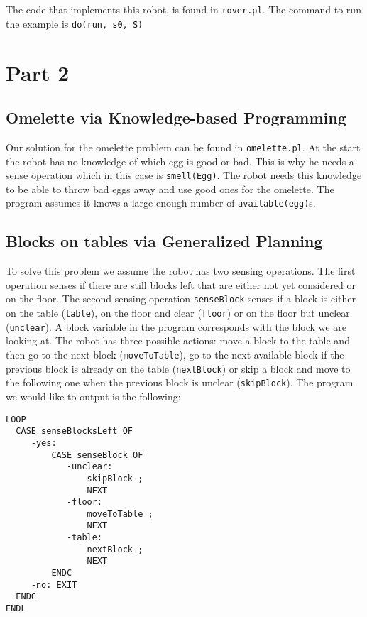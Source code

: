 \documentclass{article}
\begin{document}
The code that implements this robot, is found in \texttt{rover.pl}. The command to run the example is \texttt{do(run, s0, S)}

\section{Part 2}

\subsection{Omelette via Knowledge-based Programming}
Our solution for the omelette problem can be found in \texttt{omelette.pl}.
At the start the robot has no knowledge of which egg is good or bad. This is why he needs a sense operation which in this case is \texttt{smell(Egg)}. The robot needs this knowledge to be able to throw bad eggs away and use good ones for the omelette. The program assumes it knows a large enough number of \texttt{available(egg)}s.

\subsection{Blocks on tables via Generalized Planning}
To solve this problem we assume the robot has two sensing operations. The first operation senses if there are still blocks left that are either not yet considered or on the floor. The second sensing operation \texttt{senseBlock} senses if a block is either on the table (\texttt{table}), on the floor and clear (\texttt{floor}) or on the floor but unclear (\texttt{unclear}). A block variable in the program corresponds with the block we are looking at. The robot has three possible actions: move a block to the table and then go to the next block (\texttt{moveToTable}), go to the next available block if the previous block is already on the table (\texttt{nextBlock}) or skip a block and move to the following one when the previous block is unclear (\texttt{skipBlock}).
The program we would like to output is the following:
\begin{verbatim}
LOOP
  CASE senseBlocksLeft OF
     -yes:
         CASE senseBlock OF
            -unclear:
                skipBlock ;
                NEXT
            -floor:
                moveToTable ;
                NEXT
            -table:
                nextBlock ;
                NEXT
         ENDC
     -no: EXIT
  ENDC
ENDL
\end{verbatim}
\end{document}
